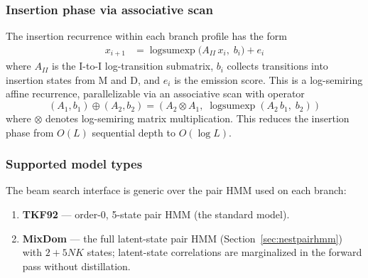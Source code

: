 \subsubsection{Insertion phase via associative scan}

The insertion recurrence within each branch profile has the form
\begin{align}
x_{i+1} &= \operatorname{logsumexp}\bigl(A_{II} \, x_i,\; b_i\bigr) + e_i
\label{eq:insert-recurrence}
\end{align}
where $A_{II}$ is the I-to-I log-transition submatrix, $b_i$ collects
transitions into insertion states from M and D, and $e_i$ is the emission score.
This is a log-semiring affine recurrence, parallelizable via
an associative scan with operator
\[
(A_1, b_1) \oplus (A_2, b_2) = (A_2 \otimes A_1,\; \operatorname{logsumexp}(A_2 \, b_1,\; b_2))
\]
where $\otimes$ denotes log-semiring matrix multiplication.
This reduces the insertion phase from $O(L)$ sequential depth to $O(\log L)$.

\subsubsection{Supported model types}

The beam search interface is generic over the pair HMM used on each branch:
\begin{enumerate}
\item \textbf{TKF92} --- order-0, 5-state pair HMM (the standard model).
\item \textbf{MixDom} --- the full latent-state pair HMM (Section~\ref{sec:nestpairhmm})
  with $2 + 5NK$ states; latent-state correlations are marginalized
  in the forward pass without distillation.
\end{enumerate}



